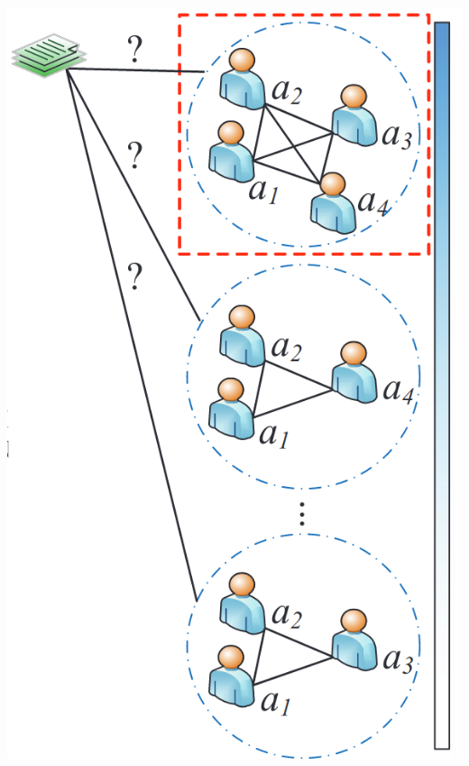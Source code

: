 \begin{frame}
\begin{columns}
\includegraphics[width=1\linewidth]{img/multiple_author}


\end{columns}
\end{frame}
